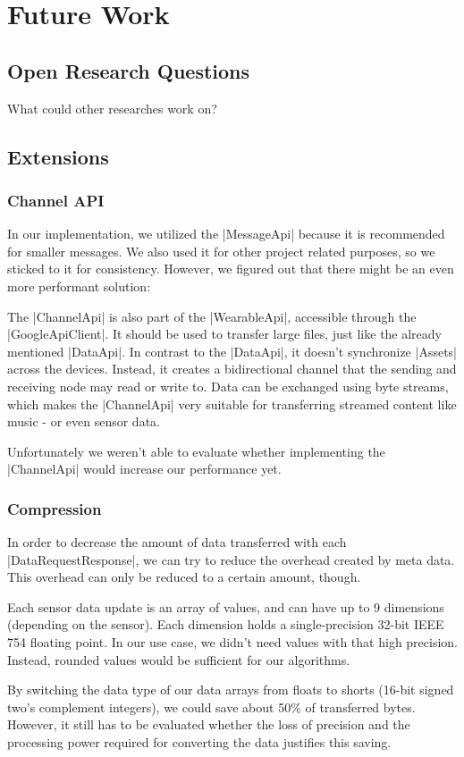 \section{Future Work}
\label{sec:futurework}

\subsection{Open Research Questions}
What could other researches work on?

\subsection{Extensions}

\subsubsection{Channel API}
In our implementation, we utilized the |MessageApi|\cite{androiddocs:messageapi} because it is recommended for smaller messages.
We also used it for other project related purposes, so we sticked to it for consistency.
However, we figured out that there might be an even more performant solution:

The |ChannelApi|\cite{androiddocs:channelapi} is also part of the |WearableApi|\cite{androiddocs:wearable}, accessible through the |GoogleApiClient|\cite{androiddocs:googleapiclient}.
It should be used to transfer large files, just like the already mentioned |DataApi|\cite{androiddocs:dataapi}.
In contrast to the |DataApi|, it doesn't synchronize |Assets|\cite{androiddocs:asset} across the devices.
Instead, it creates a bidirectional channel that the sending and receiving node may read or write to.
Data can be exchanged using byte streams, which makes the |ChannelApi| very suitable for transferring streamed content like music - or even sensor data.

Unfortunately we weren't able to evaluate whether implementing the |ChannelApi| would increase our performance yet.

\subsubsection{Compression}
In order to decrease the amount of data transferred with each |DataRequestResponse|\cite{sensordatalogger:datarequestresponse}, we can try to reduce the overhead created by meta data.
This overhead can only be reduced to a certain amount, though.

Each sensor data update is an array of values, and can have up to 9 dimensions (depending on the sensor).
Each dimension holds a single-precision 32-bit IEEE 754 floating point.
In our use case, we didn't need values with that high precision.
Instead, rounded values would be sufficient for our algorithms.

By switching the data type of our data arrays from floats to shorts (16-bit signed two's complement integers), we could save about 50\% of transferred bytes. However, it still has to be evaluated whether the loss of precision and the processing power required for converting the data justifies this saving.

\clearpage